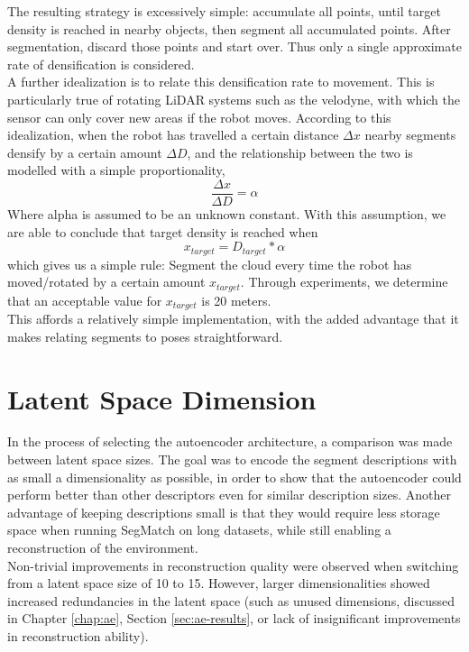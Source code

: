 The resulting strategy is excessively simple: accumulate all points, until target density is reached in nearby objects, then segment all accumulated points. After segmentation, discard those points and start over. Thus only a single approximate rate of densification is considered.\\

A further idealization is to relate this densification rate to movement. This is particularly true of rotating LiDAR systems such as the velodyne, with which the sensor can only cover new areas if the robot moves.  
According to this idealization, when the robot has travelled a certain distance $\Delta x$ nearby segments densify by a certain amount $\Delta D$, and the relationship between the two is modelled with a simple proportionality,
$$\frac{\Delta x}{\Delta D} = \alpha$$
Where alpha is assumed to be an unknown constant. With this assumption, we are able to conclude that target density is reached when
$$x_{target} = D_{target} * \alpha$$
which gives us a simple rule: Segment the cloud every time the robot has moved/rotated by a certain amount $x_{target}$. Through experiments, we determine that an acceptable value for $x_{target}$ is 20 meters.\\

This affords a relatively simple implementation, with the added advantage that it makes relating segments to poses straightforward.\\



\section{Latent Space Dimension}
\label{sec:latent_space_size}

In the process of selecting the autoencoder architecture, a comparison was made between latent space sizes. The goal was to encode the segment descriptions with as small a dimensionality as possible, in order to show that the autoencoder could perform better than other descriptors even for similar description sizes. Another advantage of keeping descriptions small is that they would require less storage space when running SegMatch on long datasets, while still enabling a reconstruction of the environment.\\

Non-trivial improvements in reconstruction quality were observed when switching from a latent space size of 10 to 15. However, larger dimensionalities showed increased redundancies in the latent space (such as unused dimensions, discussed in Chapter \ref{chap:ae}, Section \ref{sec:ae-results}, or lack of insignificant improvements in reconstruction ability).\\

